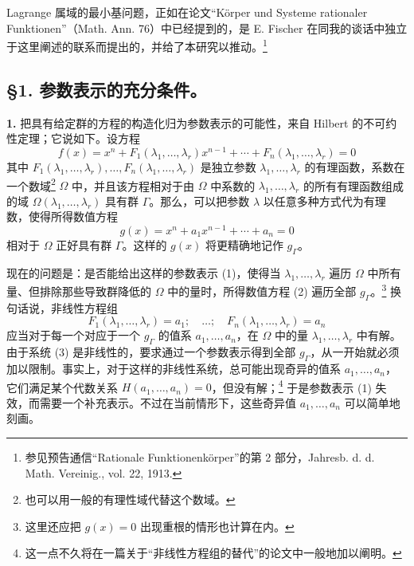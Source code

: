 Lagrange 属域的最小基问题，正如在论文“Körper und Systeme rationaler Funktionen”（Math. Ann. 76）中已经提到的，是 E. Fischer 在同我的谈话中独立于这里阐述的联系而提出的，并给了本研究以推动。\footnote{参见预告通信“Rationale Funktionenkörper”的第 2 部分，Jahresb. d. d. Math. Vereinig., vol. 22, 1913.}

\subsection*{\S 1. 参数表示的充分条件。}

\textbf{1.} 把具有给定群的方程的构造化归为参数表示的可能性，来自 Hilbert 的不可约性定理；它说如下。设方程
\begin{equation}\tag{1}
f(x)=x^n+F_1(\lambda_1,\ldots,\lambda_r)x^{n-1}+\cdots+F_n(\lambda_1,\ldots,\lambda_r)=0
\end{equation}
其中 $F_1(\lambda_1,
\ldots,\lambda_r),\ldots,F_n(\lambda_1,
\ldots,\lambda_r)$ 是独立参数 $\lambda_1,
\ldots,\lambda_r$ 的有理函数，系数在一个数域\footnote{也可以用一般的有理性域代替这个数域。} $\Omega$ 中，并且该方程相对于由 $\Omega$ 中系数的 $\lambda_1,
\ldots,\lambda_r$ 的所有有理函数组成的域 $\Omega(\lambda_1,
\ldots,\lambda_r)$ 具有群 $\Gamma$。那么，可以把参数 $\lambda$ 以任意多种方式代为有理数，使得所得数值方程
\begin{equation}\tag{2}
g(x)=x^n+a_1x^{n-1}+\cdots+a_n=0
\end{equation}
相对于 $\Omega$ 正好具有群 $\Gamma$。这样的 $g(x)$ 将更精确地记作 $g_\Gamma$。

现在的问题是：是否能给出这样的参数表示 (1)，使得当 $\lambda_1,
\ldots,\lambda_r$ 遍历 $\Omega$ 中所有量、但排除那些导致群降低的 $\Omega$ 中的量时，所得数值方程 (2) 遍历全部 $g_\Gamma$。\footnote{这里还应把 $g(x)=0$ 出现重根的情形也计算在内。} 换句话说，非线性方程组
\begin{equation}\tag{3}
F_1(\lambda_1,
\ldots,\lambda_r)=a_1;\quad \ldots;\quad F_n(\lambda_1,
\ldots,\lambda_r)=a_n
\end{equation}
应当对于每一个对应于一个 $g_\Gamma$ 的值系 $a_1,
\ldots,a_n$，在 $\Omega$ 中的量 $\lambda_1,
\ldots,\lambda_r$ 中有解。由于系统 (3) 是非线性的，要求通过一个参数表示得到全部 $g_\Gamma$，从一开始就必须加以限制。事实上，对于这样的非线性系统，总可能出现奇异的值系 $a_1,
\ldots,a_n$，它们满足某个代数关系 $H(a_1,
\ldots,a_n)=0$，但没有解；\footnote{这一点不久将在一篇关于“非线性方程组的替代”的论文中一般地加以阐明。} 于是参数表示 (1) 失效，而需要一个补充表示。不过在当前情形下，这些奇异值 $a_1,
\ldots,a_n$ 可以简单地刻画。

